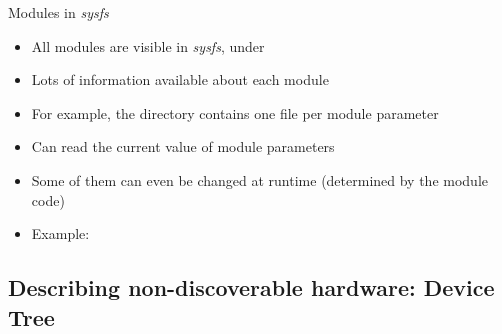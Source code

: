 \begin{frame}{Modules in {\em sysfs}}
  \begin{itemize}
  \item All modules are visible in {\em sysfs}, under 
  \item Lots of information available about each module
  \item For example, the 
    directory contains one file per module parameter
  \item Can read the current value of module parameters
  \item Some of them can even be changed at runtime (determined by the
    module code)
  \item Example:\\
  \end{itemize}
\end{frame}

\subsection{Describing non-discoverable hardware: Device Tree}

